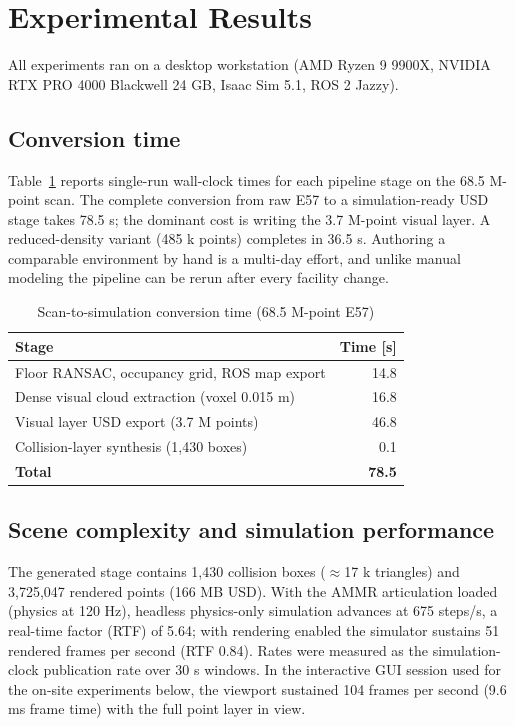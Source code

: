 \documentclass[conference]{IEEEtran}
\begin{document}
\section{Experimental Results}
All experiments ran on a desktop workstation (AMD Ryzen 9 9900X,
NVIDIA RTX PRO 4000 Blackwell 24 GB, Isaac Sim 5.1, ROS 2 Jazzy).

\subsection{Conversion time}
Table~\ref{tabtime} reports single-run wall-clock times for each
pipeline stage on the 68.5 M-point scan. The complete conversion from
raw E57 to a simulation-ready USD stage takes 78.5 s; the dominant
cost is writing the 3.7 M-point visual layer. A reduced-density
variant (485 k points) completes in 36.5 s. Authoring a comparable
environment by hand is a multi-day effort, and unlike manual modeling
the pipeline can be rerun after every facility change.

\begin{table}[htbp]
\caption{Scan-to-simulation conversion time (68.5 M-point E57)}
\begin{center}
\begin{tabular}{|l|r|}
\hline
\textbf{Stage} & \textbf{Time [s]} \\
\hline
Floor RANSAC, occupancy grid, ROS map export & 14.8 \\
Dense visual cloud extraction (voxel 0.015 m) & 16.8 \\
Visual layer USD export (3.7 M points) & 46.8 \\
Collision-layer synthesis (1{,}430 boxes) & 0.1 \\
\hline
\textbf{Total} & \textbf{78.5} \\
\hline
\end{tabular}
\label{tabtime}
\end{center}
\end{table}

\subsection{Scene complexity and simulation performance}
The generated stage contains 1{,}430 collision boxes
($\approx$17 k triangles) and 3{,}725{,}047 rendered points (166 MB
USD). With the AMMR articulation loaded (physics at 120 Hz),
headless physics-only simulation advances at 675 steps/s, a real-time
factor (RTF) of 5.64; with rendering enabled the simulator sustains
51 rendered frames per second (RTF 0.84). Rates were measured as the
simulation-clock publication rate over 30 s windows. In the interactive
GUI session used for the on-site experiments below, the viewport
sustained 104 frames per second (9.6 ms frame time) with the full point
layer in view.
\end{document}
